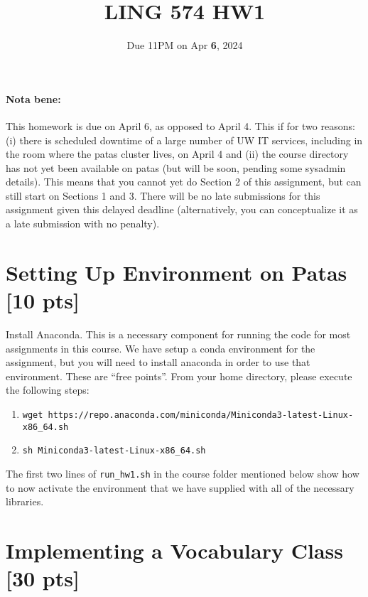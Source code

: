 \documentclass[11pt]{article}
\begin{document}
\title{LING 574 HW1}
\date{\vspace{-0.2in}Due 11PM on Apr \textbf{6}, 2024}
\author{}
\maketitle


\paragraph{Nota bene:} This homework is due on April 6, as opposed to April 4.  This if for two reasons: (i) there is scheduled downtime of a large number of UW IT services, including in the room where the patas cluster lives, on April 4 and (ii) the course directory has not yet been available on patas (but will be soon, pending some sysadmin details).  This means that you cannot yet do Section 2 of this assignment, but can still start on Sections 1 and 3.  There will be no late submissions for this assignment given this delayed deadline (alternatively, you can conceptualize it as a late submission with no penalty).

\section{Setting Up Environment on Patas [10 pts]}

Install Anaconda. This is a necessary component for running the code for most assignments in this course.  We have setup a conda environment for the assignment, but you will need to install anaconda in order to use that environment.  These are ``free points''.  From your home directory, please execute the following steps:
\begin{enumerate}
	\item \texttt{wget https://repo.anaconda.com/miniconda/Miniconda3-latest-Linux-x86\_64.sh}
	\item \texttt{sh Miniconda3-latest-Linux-x86\_64.sh}
\end{enumerate}
The first two lines of \texttt{run\_hw1.sh} in the course folder mentioned below show how to now activate the environment that we have supplied with all of the necessary libraries.


\section{Implementing a Vocabulary Class [30 pts]}
\end{document}
